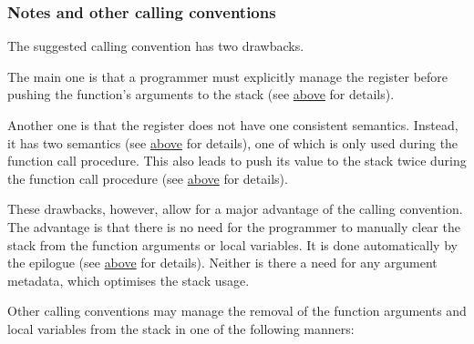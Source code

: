 \subsubsection{Notes and other calling conventions}

\vspace{-0.2cm}

The suggested calling convention has two drawbacks.

The main one is that a programmer must explicitly manage the  register
before pushing the function's arguments to the stack
(see \hyperlink{functions:call}{above} for details).

Another one is that the  register does not have one consistent semantics.
Instead, it has two semantics (see \hyperlink{r13}{above} for details),
one of which is only used during the function call procedure.
This also leads to push its value to the stack twice during the function call
procedure (see \hyperlink{functions:call}{above} for details).

These drawbacks, however, allow for a major advantage of the  calling
convention.
The advantage is that there is no need for the programmer to manually clear
the stack from the function arguments or local variables.
It is done automatically by the epilogue
(see \hyperlink{functions:return}{above} for details).
Neither is there a need for any argument metadata, which optimises the stack
usage.

Other calling conventions may manage the removal of the function arguments
and local variables from the stack in one of the following manners:

